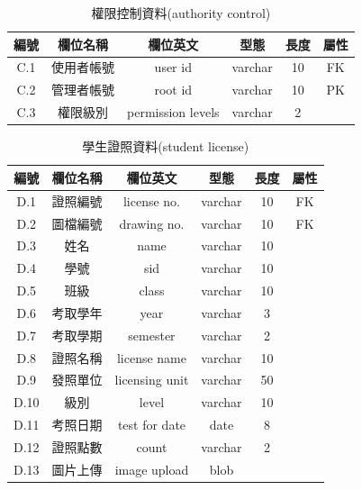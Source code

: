 \begin{table}[H]
\caption{權限控制資料(authority control)}
\label{tab:權限控制資料}
\renewcommand{\arraystretch}{1} %
\arrayrulewidth=0.5pt               %
\centering
\begin{tabular}[t]{|c|c|c|c|c|c|}  %
\hline
編號 & 欄位名稱 & 欄位英文 & 型態 & 長度 & 屬性 \\
\hline
C.1 & 使用者帳號 & user id & varchar & 10 & FK \\
\hline
C.2 & 管理者帳號 & root id & varchar & 10 & PK \\
\hline
C.3 & 權限級別 & permission levels & varchar & 2 & \\
\hline
\end{tabular}
\end{table}

\begin{table}[H]
\caption{學生證照資料(student license)}
\label{tab:學生證照資料}
\renewcommand{\arraystretch}{1} %
\arrayrulewidth=0.5pt               %
\centering
\begin{tabular}[t]{|c|c|c|c|c|c|}  %
\hline
編號 & 欄位名稱 & 欄位英文 & 型態 & 長度 & 屬性 \\
\hline
D.1 & 證照編號 & license no. & varchar & 10 & FK \\
\hline
D.2 & 圖檔編號 & drawing no. & varchar & 10 & FK \\
\hline
D.3 & 姓名 & name & varchar & 10 & \\
\hline
D.4 & 學號 & sid & varchar & 10 & \\
\hline
D.5 & 班級 & class & varchar & 10 & \\
\hline
D.6 & 考取學年 & year & varchar & 3 & \\
\hline
D.7 & 考取學期 & semester & varchar & 2 & \\
\hline
D.8 & 證照名稱 & license name & varchar & 10 & \\
\hline
D.9 & 發照單位 & licensing unit & varchar & 50 & \\
\hline
D.10 & 級別 & level & varchar & 10 & \\
\hline
D.11 & 考照日期 & test for date & date & 8 & \\
\hline
D.12 & 證照點數 & count & varchar & 2 & \\
\hline
D.13 & 圖片上傳 & image upload & blob & & \\
\hline
\end{tabular}
\end{table}


